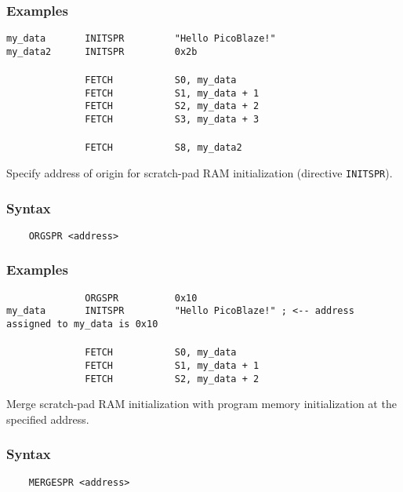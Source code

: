     \subsubsection{Examples}
        \verb'my_data       INITSPR         "Hello PicoBlaze!"'\\
        \verb'my_data2      INITSPR         0x2b'\\
        \verb''\\
        \verb'              FETCH           S0, my_data'\\
        \verb'              FETCH           S1, my_data + 1'\\
        \verb'              FETCH           S2, my_data + 2'\\
        \verb'              FETCH           S3, my_data + 3'\\
        \verb''\\
        \verb'              FETCH           S8, my_data2'

    Specify address of origin for scratch-pad RAM initialization (directive \texttt{INITSPR}).

    \subsubsection{Syntax}
        \verb'    ORGSPR <address>'

    \subsubsection{Examples}
        \verb'              ORGSPR          0x10'\\
        \verb'my_data       INITSPR         "Hello PicoBlaze!" ; <-- address assigned to my_data is 0x10'\\
        \verb''\\
        \verb'              FETCH           S0, my_data'\\
        \verb'              FETCH           S1, my_data + 1'\\
        \verb'              FETCH           S2, my_data + 2'

\clearpage
{}
    Merge scratch-pad RAM initialization with program memory initialization at the specified address.

    \subsubsection{Syntax}
        \verb'    MERGESPR <address>'

